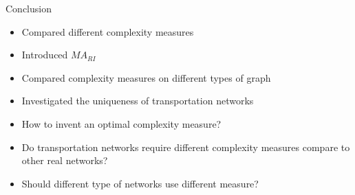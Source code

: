 \documentclass{beamer}
\begin{document}
    \begin{frame}{Conclusion}
        \begin{itemize}
            \item Compared different complexity measures
            \item Introduced $MA_{RI}$
            \item Compared complexity measures on different types of graph
            \item Investigated the uniqueness of transportation networks
            \item How to invent an optimal complexity measure?
            \item Do transportation networks require different complexity measures compare to other real networks?
            \item Should different type of networks use different measure?
        \end{itemize}
    \end{frame}
\end{document}
